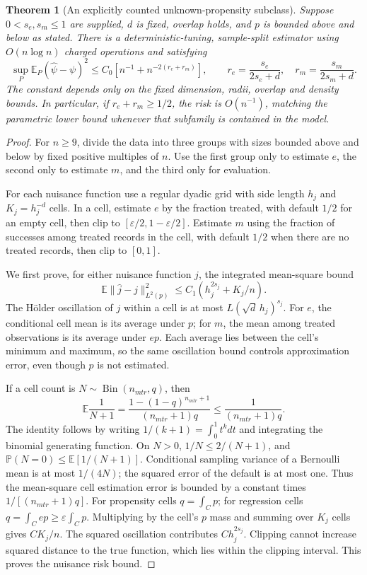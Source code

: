 \documentclass[11pt,a4paper]{article}
\newcommand{\E}{\mathbb E}
\newcommand{\Pp}{\mathbb P}
\newtheorem{theorem}{Theorem}
\theoremstyle{definition}
\begin{document}
\begin{theorem}[An explicitly counted unknown-propensity subclass]
Suppose $0<s_e,s_m\le1$ are supplied, $d$ is fixed, overlap holds, and $p$ is bounded above and below as stated. There is a deterministic-tuning, sample-split estimator using $O(n\log n)$ charged operations and satisfying
\[
 \sup_P\E_P(\widehat\psi-\psi)^2
 \le C_0\left[n^{-1}+n^{-2(r_e+r_m)}\right],
 \qquad r_e=\frac{s_e}{2s_e+d},\quad r_m=\frac{s_m}{2s_m+d}.
\]
The constant depends only on the fixed dimension, radii, overlap and density bounds. In particular, if $r_e+r_m\ge1/2$, the risk is $O(n^{-1})$, matching the parametric lower bound whenever that subfamily is contained in the model.
\end{theorem}
\begin{proof}
For $n\ge9$, divide the data into three groups with sizes bounded above and below by fixed positive multiples of $n$. Use the first group only to estimate $e$, the second only to estimate $m$, and the third only for evaluation.

For each nuisance function use a regular dyadic grid with side length $h_j$ and $K_j=h_j^{-d}$ cells. In a cell, estimate $e$ by the fraction treated, with default $1/2$ for an empty cell, then clip to $[\varepsilon/2,1-\varepsilon/2]$. Estimate $m$ using the fraction of successes among treated records in the cell, with default $1/2$ when there are no treated records, then clip to $[0,1]$.

We first prove, for either nuisance function $j$, the integrated mean-square bound
\[
 \E\|\widehat j-j\|_{L^2(p)}^2
      \le C_1(h_j^{2s_j}+K_j/n).
\]
The H\"older oscillation of $j$ within a cell is at most $L(\sqrt d\,h_j)^{s_j}$. For $e$, the conditional cell mean is its average under $p$; for $m$, the mean among treated observations is its average under $ep$. Each average lies between the cell's minimum and maximum, so the same oscillation bound controls approximation error, even though $p$ is not estimated.

If a cell count is $N\sim\operatorname{Bin}(n_{
m tr},q)$, then
\[
 \E\frac1{N+1}=\frac{1-(1-q)^{n_{
m tr}+1}}{(n_{
m tr}+1)q}
       \le\frac1{(n_{
m tr}+1)q}.
\]
The identity follows by writing $1/(k+1)=\int_0^1t^kdt$ and integrating the binomial generating function. On $N>0$, $1/N\le2/(N+1)$, and
$\Pp(N=0)\le\E[1/(N+1)]$. Conditional sampling variance of a Bernoulli mean is at most $1/(4N)$; the squared error of the default is at most one. Thus the mean-square cell estimation error is bounded by a constant times $1/[(n_{
m tr}+1)q]$. For propensity cells $q=\int_Cp$; for regression cells $q=\int_Cep\ge\varepsilon\int_Cp$. Multiplying by the cell's $p$ mass and summing over $K_j$ cells gives $C K_j/n$. The squared oscillation contributes $C h_j^{2s_j}$. Clipping cannot increase squared distance to the true function, which lies within the clipping interval. This proves the nuisance risk bound.


\end{proof}
\end{document}
